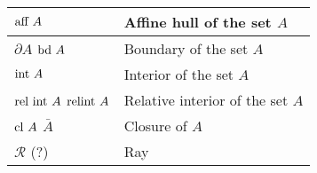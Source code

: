 \begin{xltabular}{\textwidth}{XX}
	\(\textnormal{aff } A\) \cite[p. 23]{boydConvexOptimization2004}                                                                                                      & Affine hull of the set \(A\)                                                                                                                                                                                   \\ \hline
	\(\partial A\) \cite[sec. 2.1.7]{dattorroConvexOptimizationEuclidean2010} \(\textnormal{bd } A\) \cite[appendix A.2]{boydConvexOptimization2004}                                                                                             & Boundary of the set \(A\)                                                                                                                                                                                      \\ \hline
	\(\textnormal{int } A\) \cite[sec. 2.1.6.1]{dattorroConvexOptimizationEuclidean2010} \cite[2.1.3]{boydConvexOptimization2004}                                         & Interior of the set \(A\)                                                                                                                                                                                      \\ \hline
	\(\textnormal{rel int } A\) \cite[sec. 2.1.6.1]{dattorroConvexOptimizationEuclidean2010} \newline \(\textnormal{relint } A\) \cite[2.1.3]{boydConvexOptimization2004} & Relative interior of the set \(A\)                                                                                                                                                                             \\ \hline
	\(\textnormal{cl } A\) \cite[appendix A.2]{boydConvexOptimization2004} \newline \(\bar{A}\) \cite[sec. 2.1.6.1]{dattorroConvexOptimizationEuclidean2010}              & Closure of \(A\)                                                                                                                                                                                               \\ \hline
	\(\mathcal{R}\) (?)                                                                                                                                                   & Ray                                                                                                                                                                                                            \\ \hline

\end{xltabular}
